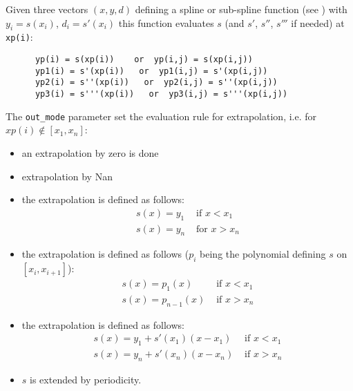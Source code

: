 \begin{mandescription}
    Given three vectors $(x,y,d)$ defining a spline or sub-spline function
    (see  ) with $y_i=s(x_i)$, $d_i = s'(x_i)$ this function
    evaluates $s$ (and $s'$, $s''$, $s'''$ if needed) at \verb!xp(i)!:
    
    \begin{verbatim}
      yp(i) = s(xp(i))    or  yp(i,j) = s(xp(i,j))
      yp1(i) = s'(xp(i))   or  yp1(i,j) = s'(xp(i,j))
      yp2(i) = s''(xp(i))   or  yp2(i,j) = s''(xp(i,j))
      yp3(i) = s'''(xp(i))   or  yp3(i,j) = s'''(xp(i,j))
    \end{verbatim}

    The \verb!out_mode! parameter set the evaluation rule for extrapolation,
    i.e. for $xp(i)  \notin [x_1,x_n]$: 
    
  \begin{itemize}

       \item {} an extrapolation by zero is done
       \item {} extrapolation by Nan
       \item {} the extrapolation is defined as follows:
      $$
      \begin{array}{ll}
      s(x) = y_1  & \mbox{ if }  x < x_1 \\
      s(x) = y_n  & \mbox{ for } x > x_n
      \end{array}
      $$   

       \item {} the extrapolation is defined as follows ($p_i$ being the polynomial defining 
              $s$ on $[x_i,x_{i+1}]$):
      $$
      \begin{array}{ll}
      s(x) = p_1(x)     &  \mbox{ if }  x < x_1 \\
      s(x) = p_{n-1}(x) &  \mbox{ if }  x > x_n
      \end{array}
      $$   

       \item {} the extrapolation is defined as follows:
      $$
      \begin{array}{ll}
      s(x) = y_1 + s'(x_1)(x-x_1) &  \mbox{ if }  x < x_1 \\
      s(x) = y_n + s'(x_n)(x-x_n) &  \mbox{ if }  x > x_n
      \end{array}
      $$   

       \item {} $s$ is extended by periodicity. 
  \end{itemize}

  \end{mandescription}

